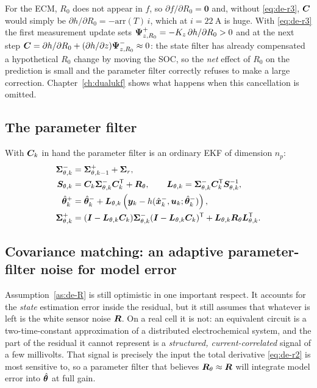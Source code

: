 \begin{remark}\label{rem:de-r3}
For the ECM, $R_0$ does not appear in $f$, so $\partial f/\partial R_0=\bm{0}$ and, without
\eqref{eq:de-r3}, $\bm{C}$ would simply be
$\partial h/\partial R_0=-\mathrm{arr}(T)\,i$, which at $i=\SI{22}{\ampere}$ is huge.  With
\eqref{eq:de-r3} the first measurement update sets
$\bm{\Psi}^+_{z,R_0}=-K_z\,\partial h/\partial R_0>0$ and at the next step
$\bm{C}=\partial h/\partial R_0+(\partial h/\partial z)\bm{\Psi}^-_{z,R_0}\approx0$: the state
filter has already compensated a hypothetical $R_0$ change by moving the SOC, so the \emph{net}
effect of $R_0$ on the prediction is small and the parameter filter correctly refuses to make a
large correction.  Chapter~\ref{ch:dualukf} shows what happens when this cancellation is omitted.
\end{remark}

\subsection{The parameter filter}
With $\bm{C}_k$ in hand the parameter filter is an ordinary EKF of dimension $n_p$:
\begin{align}
\bm{\Sigma}^-_{\theta,k}&=\bm{\Sigma}^+_{\theta,k-1}+\bm{\Sigma}_r, \label{eq:de-tu}\\
\bm{S}_{\theta,k}&=\bm{C}_k\bm{\Sigma}^-_{\theta,k}\bm{C}_k^{\mathsf{T}}+\bm{R}_\theta,\qquad
\bm{L}_{\theta,k}=\bm{\Sigma}^-_{\theta,k}\bm{C}_k^{\mathsf{T}}\bm{S}_{\theta,k}^{-1}, \label{eq:de-gain}\\
\hat{\bm{\theta}}^+_k&=\hat{\bm{\theta}}^-_k+\bm{L}_{\theta,k}\left(\bm{y}_k-h(\hat{\bm{x}}^{-}_k,\bm{u}_k;\hat{\bm{\theta}}^-_k)\right), \label{eq:de-upd}\\
\bm{\Sigma}^+_{\theta,k}&=(\bm{I}-\bm{L}_{\theta,k}\bm{C}_k)\bm{\Sigma}^-_{\theta,k}(\bm{I}-\bm{L}_{\theta,k}\bm{C}_k)^{\mathsf{T}}+\bm{L}_{\theta,k}\bm{R}_\theta\bm{L}_{\theta,k}^{\mathsf{T}} . \label{eq:de-cov}
\end{align}

\subsection{Covariance matching: an adaptive parameter-filter noise for model error}
\label{sec:de-adapt}
Assumption~\ref{as:de-R} is still optimistic in one important respect.  It accounts for the
\emph{state} estimation error inside the residual, but it still assumes that whatever is left is the
white sensor noise $\bm{R}$.  On a real cell it is not: an equivalent circuit is a two-time-constant
approximation of a distributed electrochemical system, and the part of the residual it cannot
represent is a \emph{structured, current-correlated} signal of a few millivolts.  That signal is
precisely the input the total derivative \eqref{eq:de-r2} is most sensitive to, so a parameter filter
that believes $\bm{R}_\theta\approx\bm{R}$ will integrate model error into $\hat{\bm{\theta}}$ at full gain.

